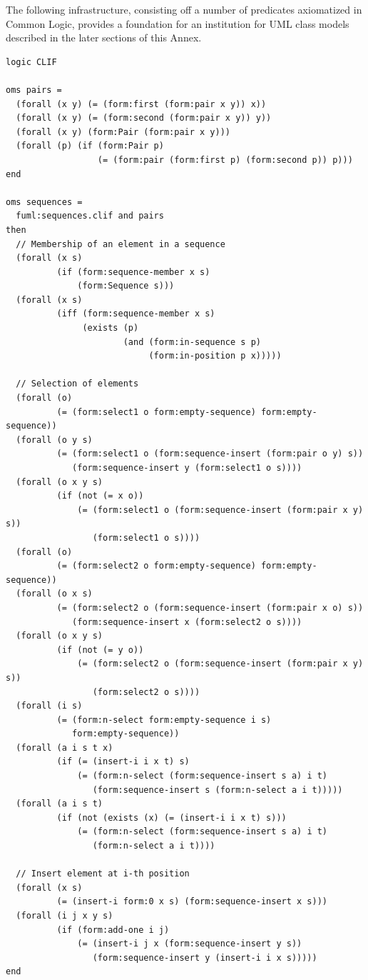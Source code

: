 \documentclass[10pt, a4paper]{isov2}
\begin{document}
The following infrastructure, consisting off a number of predicates
axiomatized in Common Logic, provides a foundation for an institution
for UML class models described in the later sections of this Annex.
%
\begin{lstlisting}[language=clif, basicstyle={\ttfamily\fontsize{8pt}{9pt}\selectfont},
                   morekeywords={then, with, logic, oms, end},
                   morecomment={[l]{//}},
                   mathescape]
logic CLIF

oms pairs =
  (forall (x y) (= (form:first (form:pair x y)) x))
  (forall (x y) (= (form:second (form:pair x y)) y))
  (forall (x y) (form:Pair (form:pair x y)))
  (forall (p) (if (form:Pair p)
                  (= (form:pair (form:first p) (form:second p)) p)))
end

oms sequences =
  fuml:sequences.clif and pairs
then
  // Membership of an element in a sequence
  (forall (x s)
          (if (form:sequence-member x s)
              (form:Sequence s)))
  (forall (x s)
          (iff (form:sequence-member x s)
               (exists (p) 
                       (and (form:in-sequence s p)
                            (form:in-position p x)))))

  // Selection of elements
  (forall (o)
          (= (form:select1 o form:empty-sequence) form:empty-sequence))
  (forall (o y s)
          (= (form:select1 o (form:sequence-insert (form:pair o y) s)) 
             (form:sequence-insert y (form:select1 o s))))
  (forall (o x y s)
          (if (not (= x o))
              (= (form:select1 o (form:sequence-insert (form:pair x y) s)) 
                 (form:select1 o s))))
  (forall (o)
          (= (form:select2 o form:empty-sequence) form:empty-sequence))
  (forall (o x s)
          (= (form:select2 o (form:sequence-insert (form:pair x o) s)) 
             (form:sequence-insert x (form:select2 o s))))
  (forall (o x y s)
          (if (not (= y o))
              (= (form:select2 o (form:sequence-insert (form:pair x y) s)) 
                 (form:select2 o s))))
  (forall (i s)
          (= (form:n-select form:empty-sequence i s) 
             form:empty-sequence))
  (forall (a i s t x)
          (if (= (insert-i i x t) s)
              (= (form:n-select (form:sequence-insert s a) i t)
                 (form:sequence-insert s (form:n-select a i t)))))
  (forall (a i s t)
          (if (not (exists (x) (= (insert-i i x t) s)))
              (= (form:n-select (form:sequence-insert s a) i t)
                 (form:n-select a i t))))

  // Insert element at i-th position
  (forall (x s)
          (= (insert-i form:0 x s) (form:sequence-insert x s)))
  (forall (i j x y s)
          (if (form:add-one i j)
              (= (insert-i j x (form:sequence-insert y s))
                 (form:sequence-insert y (insert-i i x s)))))
end


\end{lstlisting}
\end{document}
